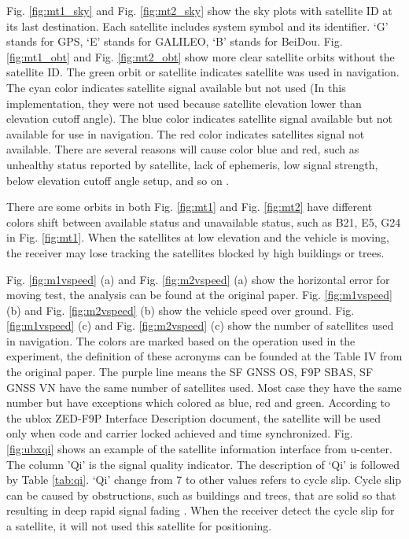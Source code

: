\documentclass[letterpaper, 10 pt,onecolumn]{article}
\begin{document}
	
	Fig. \ref{fig:mt1_sky} and Fig. \ref{fig:mt2_sky}  show the sky plots with satellite ID at its last destination. Each satellite includes system symbol and its identifier. `G' stands for GPS, `E' stands for GALILEO, `B' stands for BeiDou. Fig. \ref{fig:mt1_obt} and Fig. \ref{fig:mt2_obt} show more clear satellite orbits without the satellite ID. The green orbit or satellite indicates satellite was used in navigation. The cyan color indicates satellite signal available but not used (In this implementation, they were not used because satellite elevation lower than elevation cutoff angle). The blue color indicates satellite signal available but not available for use in navigation. The red color indicates satellites signal not available. There are several reasons will cause color blue and red, such as unhealthy status reported by satellite, lack of ephemeris, low signal strength, below elevation cutoff angle setup, and so on \cite{ucenter}. 
	
	There are some orbits in both Fig. \ref{fig:mt1} and Fig. \ref{fig:mt2} have different colors shift between available status and unavailable status, such as B21, E5, G24 in Fig. \ref{fig:mt1}. When the satellites at low elevation and the vehicle is moving, the receiver may lose tracking the satellites blocked by high buildings or trees. 
	
	Fig. \ref{fig:m1vspeed} (a) and Fig. \ref{fig:m2vspeed} (a) show the horizontal error for moving test, the analysis can be found at the original paper. Fig. \ref{fig:m1vspeed} (b) and Fig. \ref{fig:m2vspeed} (b) show the vehicle speed over ground. Fig. \ref{fig:m1vspeed} (c) and Fig. \ref{fig:m2vspeed} (c) show the number of satellites used in navigation. The colors are marked based on the operation used in the experiment, the definition of these acronyms can be founded at the Table IV from the original paper. The purple line means the SF GNSS OS, F9P SBAS, SF GNSS VN have the same number of satellites used. Most case they have the same number but have exceptions which colored as blue, red and green. According to the ublox ZED-F9P Interface Description document, the satellite will be used only when code and carrier locked achieved and time synchronized. Fig. \ref{fig:ubxqi} shows an example of the satellite information interface from u-center. The column 'Qi' is the signal quality indicator. The description of `Qi' is followed by Table \ref{tab:qi}. `Qi' change from 7 to other values refers to cycle slip. Cycle slip can be caused by obstructions, such as buildings and trees, that are solid so that resulting in deep rapid signal fading \cite{sennott1992use}. When the receiver detect the cycle slip for a satellite, it will not used this satellite for positioning.
	
\end{document}
